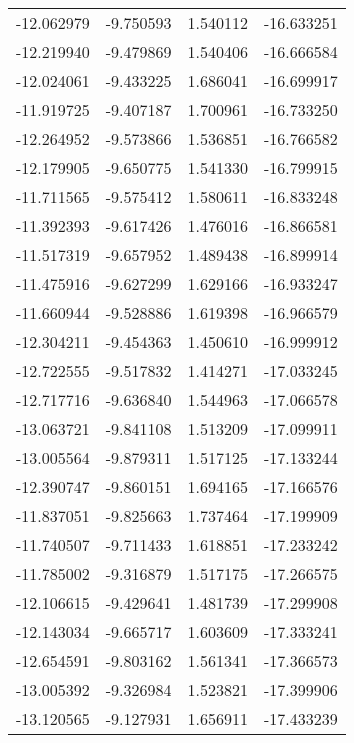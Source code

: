 \begin{tabular}{rrrr}
      -12.062979 &        -9.750593 &    1.540112 & -16.633251 \\
      -12.219940 &        -9.479869 &    1.540406 & -16.666584 \\
      -12.024061 &        -9.433225 &    1.686041 & -16.699917 \\
      -11.919725 &        -9.407187 &    1.700961 & -16.733250 \\
      -12.264952 &        -9.573866 &    1.536851 & -16.766582 \\
      -12.179905 &        -9.650775 &    1.541330 & -16.799915 \\
      -11.711565 &        -9.575412 &    1.580611 & -16.833248 \\
      -11.392393 &        -9.617426 &    1.476016 & -16.866581 \\
      -11.517319 &        -9.657952 &    1.489438 & -16.899914 \\
      -11.475916 &        -9.627299 &    1.629166 & -16.933247 \\
      -11.660944 &        -9.528886 &    1.619398 & -16.966579 \\
      -12.304211 &        -9.454363 &    1.450610 & -16.999912 \\
      -12.722555 &        -9.517832 &    1.414271 & -17.033245 \\
      -12.717716 &        -9.636840 &    1.544963 & -17.066578 \\
      -13.063721 &        -9.841108 &    1.513209 & -17.099911 \\
      -13.005564 &        -9.879311 &    1.517125 & -17.133244 \\
      -12.390747 &        -9.860151 &    1.694165 & -17.166576 \\
      -11.837051 &        -9.825663 &    1.737464 & -17.199909 \\
      -11.740507 &        -9.711433 &    1.618851 & -17.233242 \\
      -11.785002 &        -9.316879 &    1.517175 & -17.266575 \\
      -12.106615 &        -9.429641 &    1.481739 & -17.299908 \\
      -12.143034 &        -9.665717 &    1.603609 & -17.333241 \\
      -12.654591 &        -9.803162 &    1.561341 & -17.366573 \\
      -13.005392 &        -9.326984 &    1.523821 & -17.399906 \\
      -13.120565 &        -9.127931 &    1.656911 & -17.433239 \\

\end{tabular}
